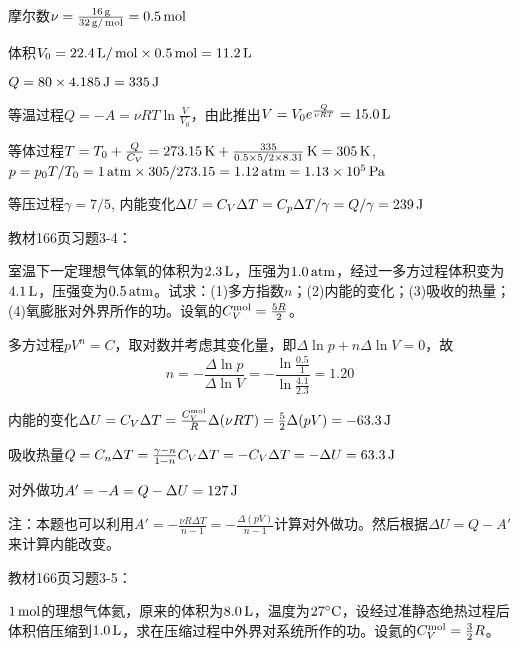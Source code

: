 \documentclass[CJK]{beamer}
\begin{document}
\begin{frame}
  \bch
  摩尔数$\nu = \frac{16\,\mathrm{g}}{32\,\mathrm{g}/\,\mathrm{mol}} = 0.5\,\mathrm{mol}$
  
  体积$V_0 = 22.4\,\mathrm{L}/\,\mathrm{mol} \times 0.5\,\mathrm{mol} = 11.2\,\mathrm{L}$

  $Q = 80\times 4.185 \,\mathrm{J} = 335\,\mathrm{J}$
  \bitem
\item{等温过程$Q = -A = \nu RT \ln\frac{V}{V_0}$，由此推出$V = V_0e^{\frac{Q}{\nu RT}} = 15.0\,\mathrm{L}$}
\item{等体过程$T = T_0+ \frac{Q}{C_V} = 273.15\,\mathrm{K} + \frac{335}{0.5\times 5/2\times 8.31}\,\mathrm{K} = 305\,\mathrm{K}$, $p = p_0 T/T_0 = 1\,\mathrm{atm} \times 305/273.15 = 1.12 \,\mathrm{atm} = 1.13\times 10^5\,\mathrm{Pa}$}
\item{等压过程$\gamma = 7/5$, 内能变化$\Delta U = C_V\Delta T = C_p\Delta T /\gamma = Q/\gamma = 239\,\mathrm{J}$}
  \eitem
  
  \ech
\end{frame}

\begin{frame}
  \chtitle{\proid (\stwo)}
  \bch
  教材166页习题3-4：

  室温下一定理想气体氧的体积为$2.3\,\mathrm{L}$，压强为$1.0\,\mathrm{atm}$，经过一多方过程体积变为$4.1\,\mathrm{L}$，压强变为$0.5\,\mathrm{atm}$。试求：(1)多方指数$n$；(2)内能的变化；(3)吸收的热量；(4)氧膨胀对外界所作的功。设氧的$C_V^{\rm mol}=\frac{5R}{2}$。
  \ech
\end{frame}

\begin{frame}
  \bch
      {\small
        \bitem
      \item{
        多方过程$pV^n = C$，取对数并考虑其变化量，即$\Delta \ln p + n \Delta \ln V = 0$，故
        $$n = - \frac{\Delta \ln p}{\Delta \ln V} = -\frac{\ln\frac{0.5}{1}}{\ln\frac{4.1}{2.3}} = 1.20 $$}
      \item{内能的变化$\Delta U  = C_V\Delta T = \frac{C_V^{\rm mol}}{R}\Delta (\nu RT) = \frac{5}{2}\Delta(pV) = -63.3\,\mathrm{J}$}
      \item{吸收热量$Q = C_n \Delta T = \frac{\gamma-n}{1-n}C_V\Delta T = -C_V\Delta T = -\Delta U = 63.3\,\mathrm{J}$}
      \item{对外做功$A'=-A = Q-\Delta U = 127\,\mathrm{J}$}
        \eitem
        \skipline
        
注：本题也可以利用$A' = -\frac{\nu R \Delta T}{n-1} =-\frac{\Delta(pV)}{n-1}$计算对外做功。然后根据$\Delta U = Q-A'$来计算内能改变。        
  }
  \ech
\end{frame}

\begin{frame}
  \chtitle{\proid (\sone)}
  \bch
  教材166页习题3-5：

  $1\,\mathrm{mol}$的理想气体氦，原来的体积为$8.0\,\mathrm{L}$，温度为$27^\circ \mathrm{C}$，设经过准静态绝热过程后体积倍压缩到$1.0\,\mathrm{L}$，求在压缩过程中外界对系统所作的功。设氦的$C_V^{\rm mol} = \frac{3}{2}R$。
  \ech
\end{frame}
\end{document}
